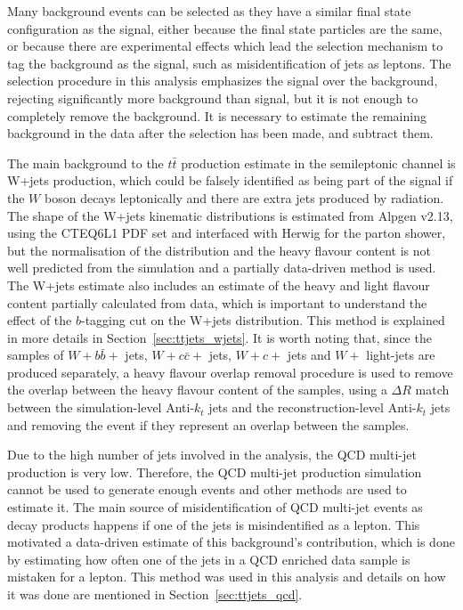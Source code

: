 Many background events can be selected as they have a similar final state configuration as the signal, either because the final state particles are the same,
or because there are experimental effects which lead the selection mechanism to tag the background as the signal,
such as misidentification of jets as leptons.
The selection procedure in this
analysis emphasizes the \ttbar signal over the background, rejecting significantly more background than signal, but it is not enough
to completely remove the background.
It is necessary to estimate the remaining background in the data after the selection has been made,
and subtract them.

The main background to the $t\bar{t}$ production estimate in the semileptonic channel is W+jets production, which could
be falsely identified as being part of the signal if the $W$ boson decays leptonically and there are extra jets produced by radiation.
The shape of the W+jets kinematic distributions is estimated from Alpgen v2.13, using the CTEQ6L1 PDF set and interfaced with Herwig for the parton shower,
but the normalisation of the distribution and the
heavy flavour content is not well
predicted from the simulation and a partially data-driven method is used. The W+jets estimate also includes an estimate of the heavy and light flavour content
partially calculated from data, which is important to understand the effect of the $b$-tagging cut on the W+jets distribution. This method is explained in more details
in Section~\ref{sec:ttjets_wjets}. It is worth noting that, since the samples of $W + b\bar{b} +$ jets, $W + c\bar{c} +$ jets, $W + c +$ jets and $W +$ light-jets are produced
separately, a heavy flavour overlap removal procedure is used to remove the overlap between the heavy flavour content of the samples, using a $\Delta R$ match between
the simulation-level Anti-$k_t$ jets and the reconstruction-level Anti-$k_t$ jets and removing the event if they represent an overlap between the samples.

Due to the high number of jets involved in the analysis, the QCD multi-jet production
is very low. Therefore,
the QCD multi-jet production simulation cannot be used to generate enough events and other methods are used to estimate it.
The main source of misidentification of QCD multi-jet events as \ttbar decay products happens if one of the
jets is misindentified as a lepton.
This motivated a data-driven estimate of this background's contribution, which is done by estimating how often one of
the jets in a QCD enriched data sample is mistaken for a lepton. This method was used in this analysis and details on how it was done are mentioned in
Section~\ref{sec:ttjets_qcd}.


